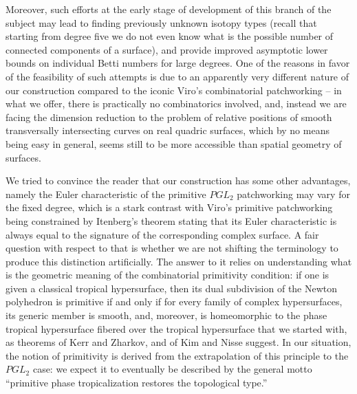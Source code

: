 \documentclass[pdflatex,sn-mathphys-num]{sn-jnl}%
\theoremstyle{thmstyleone}%
\theoremstyle{thmstyletwo}%
\theoremstyle{thmstylethree}%
\begin{document}
Moreover, such  efforts at the early stage of development of this branch of the subject may lead to finding previously unknown isotopy types (recall that starting from degree five we do not even know what is the possible number of connected components of a surface), and provide improved asymptotic lower bounds on individual Betti numbers for large degrees. One of the reasons in favor of the feasibility of such attempts is due to an apparently very different nature of our construction compared to the iconic Viro's combinatorial patchworking -- in what we offer, there is practically no combinatorics involved, and, instead we are facing the dimension reduction to the problem of relative positions of smooth transversally intersecting curves on real quadric surfaces, which by no means being easy in general, seems still to be more accessible than spatial geometry of surfaces.

We tried to convince the reader that our construction has some other advantages, namely the Euler characteristic of the primitive $PGL_2$ patchworking may vary for the fixed degree, which is a stark contrast with Viro's primitive patchworking being constrained by Itenberg's theorem stating that its Euler characteristic is always equal to the signature of the corresponding complex surface. A fair question with respect to that is whether we are not shifting the terminology to produce this
distinction artificially. The answer to it relies on understanding what is the geometric meaning of the combinatorial primitivity condition: if one is given a classical tropical hypersurface, then its dual subdivision of the Newton polyhedron is primitive if and only if for every family of complex hypersurfaces, its generic member is smooth, and, moreover, is homeomorphic to the phase tropical hypersurface fibered over the tropical hypersurface that we started with, as theorems of Kerr and Zharkov, and of Kim and Nisse suggest. In our situation, the notion of primitivity is derived from the extrapolation of this principle to the $PGL_2$ case: we expect it to eventually be described by the general motto “primitive phase tropicalization restores the topological type.”
\end{document}
